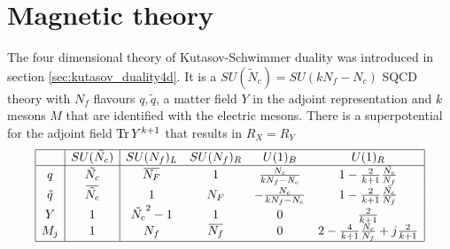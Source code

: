 \section{Magnetic theory}
The four dimensional theory of Kutasov-Schwimmer duality was introduced in section \ref{sec:kutasov_duality4d}. 
It is a $SU(\tilde{N}_c) = SU( k N_f - N_c)$ SQCD theory with $N_f$ flavours $q,\tilde{q} $, a matter field $Y$ in the adjoint representation and $k$ mesons $M$ that are identified with the electric mesons. There is a superpotential for the adjoint field $ \mathrm{Tr } \, Y^{k+1}$ that results in $R_X = R_Y$\\
\begin{equation}
\begin{array}{|c |  c | c c c c |}
\hline
 & SU(\tilde{N_c})  & SU(N_f)_L  &SU(N_f)_R   & U(1)_B &  U(1)_R \\
\hline
q &  \tilde{N_c} & \overbar{N_F}  & 1   &   \frac{N_c}{k N_f - N_c }  &  1 - \frac{2}{k+1} \frac{ \tilde{N_c}}{N_f}  \\
\tilde{q} & \overbar{\tilde{N_c}}  & 1  &  N_F  & -\frac{N_c}{k N_f - N_c }   &   1 - \frac{2}{k+1} \frac{\tilde{N_c}}{N_f}   \\
Y & 1  &  \tilde{N_c}^2-1  & 1    & 0   &  \frac{2}{k+1} \\
 M_j & 1 & N_f &  \overbar{N_f} & 0 & 2 - \frac{4}{k+1} \frac{N_c}{N_f} + j \frac{2}{k+1} \\
 \hline
\end{array}
\end{equation}
